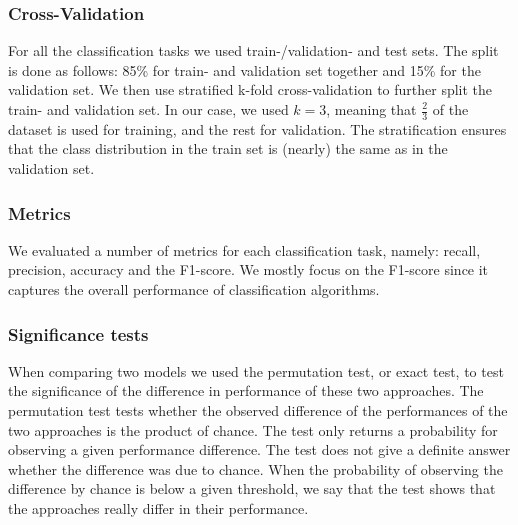 
\subsubsection{Cross-Validation}
For all the classification tasks we used train-/validation- and test sets.
The split is done as follows: 85\% for train- and validation set together and 15\% for the validation set.
We then use stratified k-fold cross-validation to further split the train- and validation set. In our case, we used $k = 3$, meaning that $\frac{2}{3}$ of the dataset is used for training, and the rest for validation.
The stratification ensures that the class distribution in the train set is (nearly) the same as in the validation set.

\subsubsection{Metrics}
We evaluated a number of metrics for each classification task, namely: 
recall, precision, accuracy and the F1-score. We mostly focus on the F1-score since it captures the overall performance of classification algorithms.

\subsubsection{Significance tests}
When comparing two models we used the permutation test, or exact test, to test the significance of the difference in performance of these two approaches.
The permutation test tests whether the observed difference of the performances of the two approaches is the product of chance.
The test only returns a probability for observing a given performance difference. The test does not give a definite answer whether the difference was due to chance.
When the probability of observing the difference by chance is below a given threshold, we say that the test shows that the approaches really differ in their performance.


